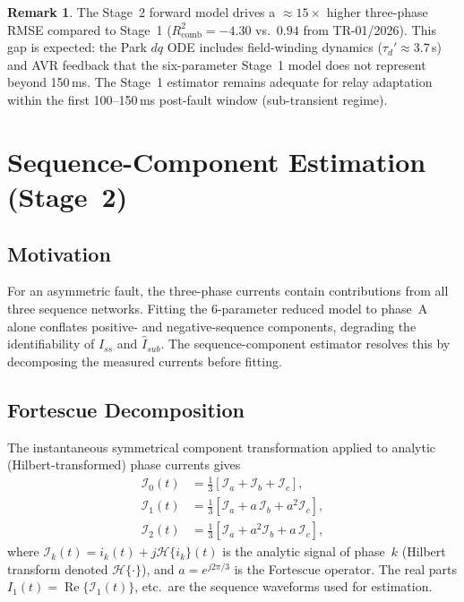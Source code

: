 \documentclass[12pt,a4paper]{article}
\theoremstyle{definition}
\newtheorem{remark}{Remark}[section]
\theoremstyle{plain}
\begin{document}
\begin{remark}
  The Stage~2 forward model drives a $\approx 15\times$ higher three-phase
  RMSE compared to Stage~1 ($R^2_{\mathrm{comb}} = -4.30$ vs.\ $0.94$
  from TR-01/2026).  This gap is expected: the Park $dq$ ODE includes
  field-winding dynamics ($\tau_d' \approx 3.7$\,s) and AVR feedback that
  the six-parameter Stage~1 model does not represent beyond 150\,ms.
  The Stage~1 estimator remains adequate for relay adaptation within the
  first 100--150\,ms post-fault window (sub-transient regime).
\end{remark}

\section{Sequence-Component Estimation (Stage~2)}
\label{sec:seqest}

\subsection{Motivation}
\label{sec:seqest:motivation}

For an asymmetric fault, the three-phase currents contain contributions from
all three sequence networks.  Fitting the 6-parameter reduced model to phase~A
alone conflates positive- and negative-sequence components, degrading the
identifiability of $\hat{I}_{ss}$ and $\hat{I}_{sub}$.  The sequence-component
estimator resolves this by decomposing the measured currents before fitting.

\subsection{Fortescue Decomposition}
\label{sec:seqest:fortescue}

The instantaneous symmetrical component transformation \citep{Kimbark1956}
applied to analytic (Hilbert-transformed) phase currents gives
\begin{align}
  \mathcal{I}_0(t) &= \tfrac{1}{3}\left[\mathcal{I}_a + \mathcal{I}_b + \mathcal{I}_c\right],\\
  \mathcal{I}_1(t) &= \tfrac{1}{3}\left[\mathcal{I}_a + a\,\mathcal{I}_b + a^2\mathcal{I}_c\right],
  \label{eq:seq:I1}\\
  \mathcal{I}_2(t) &= \tfrac{1}{3}\left[\mathcal{I}_a + a^2\mathcal{I}_b + a\,\mathcal{I}_c\right],
\end{align}
where $\mathcal{I}_k(t) = i_k(t) + j\mathcal{H}\{i_k\}(t)$ is the analytic
signal of phase~$k$ (Hilbert transform denoted $\mathcal{H}\{\cdot\}$),
and $a = e^{j2\pi/3}$ is the Fortescue operator.  The real parts
$I_1(t) = \operatorname{Re}\{\mathcal{I}_1(t)\}$, etc.\ are the sequence
waveforms used for estimation.
\end{document}
